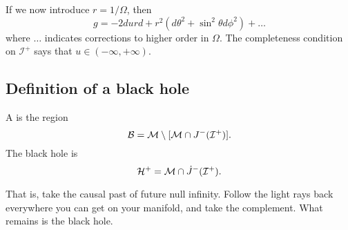 If we now introduce $r=1/\Omega$, then
\begin{equation}
    g= -2du rd + r^2 (d\theta^2+\sin^2\theta d\phi^2)+\ldots
\end{equation}
where $\ldots$ indicates corrections to higher order in $\Omega$. The completeness condition on $\mathcal{I}^+$ says that $u\in (-\infty,+\infty)$.

\subsection*{Definition of a black hole}
\begin{defn}
    A  is the region
    \begin{equation}
        \mathcal{B}=\mathcal{M} \setminus [\mathcal{M} \cap J^-(\mathcal{I}^+)].
    \end{equation}
    The black hole  is
    \begin{equation}
        \mathcal H^+ = \mathcal{M} \cap \dot J^{-}(\mathcal{I}^+).
    \end{equation}
\end{defn}
That is, take the causal past of future null infinity. Follow the light rays back everywhere you can get on your manifold, and take the complement. What remains is the black hole.
